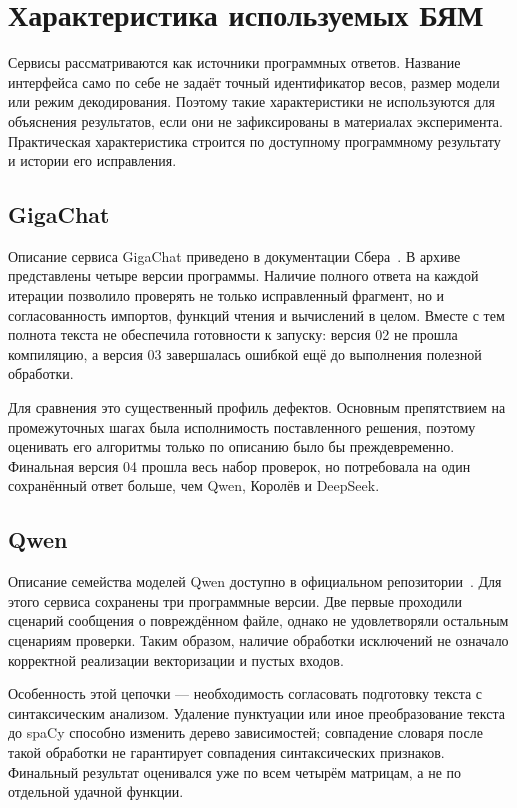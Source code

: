 \section{Характеристика используемых БЯМ}
Сервисы рассматриваются как источники программных ответов. Название интерфейса само по себе не задаёт точный идентификатор весов, размер модели или режим декодирования. Поэтому такие характеристики не используются для объяснения результатов, если они не зафиксированы в материалах эксперимента. Практическая характеристика строится по доступному программному результату и истории его исправления.

\subsection{GigaChat}
Описание сервиса GigaChat приведено в документации Сбера~\cite{gigachat}. В архиве представлены четыре версии программы. Наличие полного ответа на каждой итерации позволило проверять не только исправленный фрагмент, но и согласованность импортов, функций чтения и вычислений в целом. Вместе с тем полнота текста не обеспечила готовности к запуску: версия 02 не прошла компиляцию, а версия 03 завершалась ошибкой ещё до выполнения полезной обработки.

Для сравнения это существенный профиль дефектов. Основным препятствием на промежуточных шагах была исполнимость поставленного решения, поэтому оценивать его алгоритмы только по описанию было бы преждевременно. Финальная версия 04 прошла весь набор проверок, но потребовала на один сохранённый ответ больше, чем Qwen, Королёв и DeepSeek.

\subsection{Qwen}
Описание семейства моделей Qwen доступно в официальном репозитории~\cite{qwen}. Для этого сервиса сохранены три программные версии. Две первые проходили сценарий сообщения о повреждённом файле, однако не удовлетворяли остальным сценариям проверки. Таким образом, наличие обработки исключений не означало корректной реализации векторизации и пустых входов.

Особенность этой цепочки — необходимость согласовать подготовку текста с синтаксическим анализом. Удаление пунктуации или иное преобразование текста до spaCy способно изменить дерево зависимостей; совпадение словаря после такой обработки не гарантирует совпадения синтаксических признаков. Финальный результат оценивался уже по всем четырём матрицам, а не по отдельной удачной функции.


